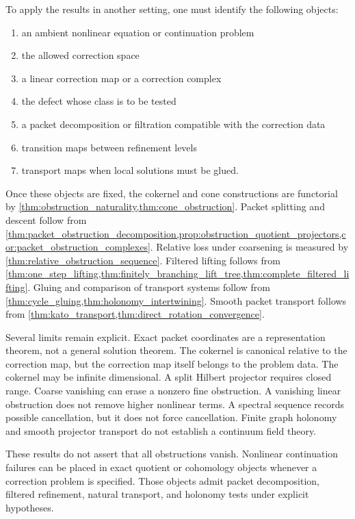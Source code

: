 \documentclass{aomart}
\theoremstyle{definition}
\theoremstyle{remark}
\begin{document}
To apply the results in another setting, one must identify the following objects:
\begin{enumerate}
\item an ambient nonlinear equation or continuation problem
\item the allowed correction space
\item a linear correction map or a correction complex
\item the defect whose class is to be tested
\item a packet decomposition or filtration compatible with the correction data
\item transition maps between refinement levels
\item transport maps when local solutions must be glued.
\end{enumerate}

Once these objects are fixed, the cokernel and cone constructions are functorial by \cref{thm:obstruction_naturality,thm:cone_obstruction}.  Packet splitting and descent follow from \cref{thm:packet_obstruction_decomposition,prop:obstruction_quotient_projectors,cor:packet_obstruction_complexes}.  Relative loss under coarsening is measured by \cref{thm:relative_obstruction_sequence}.  Filtered lifting follows from \cref{thm:one_step_lifting,thm:finitely_branching_lift_tree,thm:complete_filtered_lifting}.  Gluing and comparison of transport systems follow from \cref{thm:cycle_gluing,thm:holonomy_intertwining}.  Smooth packet transport follows from \cref{thm:kato_transport,thm:direct_rotation_convergence}.

Several limits remain explicit.  Exact packet coordinates are a representation theorem, not a general solution theorem.  The cokernel is canonical relative to the correction map, but the correction map itself belongs to the problem data.  The cokernel may be infinite dimensional.  A split Hilbert projector requires closed range.  Coarse vanishing can erase a nonzero fine obstruction.  A vanishing linear obstruction does not remove higher nonlinear terms.  A spectral sequence records possible cancellation, but it does not force cancellation.  Finite graph holonomy and smooth projector transport do not establish a continuum field theory.

These results do not assert that all obstructions vanish.  Nonlinear continuation failures can be placed in exact quotient or cohomology objects whenever a correction problem is specified.  Those objects admit packet decomposition, filtered refinement, natural transport, and holonomy tests under explicit hypotheses.
\end{document}

